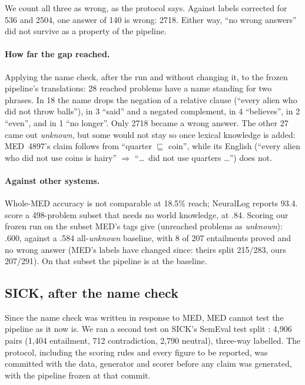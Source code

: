 \documentclass[11pt]{article}
\newcommand{\unk}{\textit{unknown}}
\begin{document}
We count all three as wrong, as the protocol says. Against labels
corrected for 536 and 2504, one answer of 140 is wrong: 2718. Either
way, ``no wrong answers'' did not survive as a property of the pipeline.

\paragraph{How far the gap reached.} Applying the name check, after the
run and without changing it, to the frozen pipeline's translations: 28
reached problems have a name standing for two phrases. In 18 the name
drops the negation of a relative clause (``every alien who did not
throw balls''), in 3 ``said'' and a negated complement, in 4
``believes'', in 2 ``even'', and in 1 ``no longer''. Only 2718 became
a wrong answer. The other 27 came out \unk{}, but some would not stay
so once lexical knowledge is added: MED~4897's claim follows from
``quarter $\sqsubseteq$ coin'', while its English (``every alien who did
not use coins is hairy'' $\Rightarrow$ ``\ldots\ did not use quarters
\ldots'') does not.

\paragraph{Against other systems.} Whole-MED accuracy is not comparable
at 18.5\% reach; NeuralLog \citep{chen-etal-2021-neurallog} reports 93.4.
\citet{haruta-etal-2020-logical} score a 498-problem subset that needs no
world knowledge, at .84. Scoring our frozen run on the subset MED's tags
give (unreached problems as \unk{}): .600, against a .584
all-\unk{} baseline, with 8 of 207 entailments proved and no wrong
answer (MED's labels have changed since: theirs split 215/283, ours
207/291). On that subset the pipeline is at the baseline.

\subsection{SICK, after the name check}

Since the name check was written in response to MED, MED cannot test the
pipeline as it now is. We ran a second test on SICK's SemEval test split
\citep{marelli-etal-2014-sick}: 4,906 pairs (1,404 entailment, 712
contradiction, 2,790 neutral), three-way labelled. The protocol,
including the scoring rules and every figure to be reported, was
committed with the data, generator and scorer before any claim was
generated, with the pipeline frozen at that commit.
\end{document}
